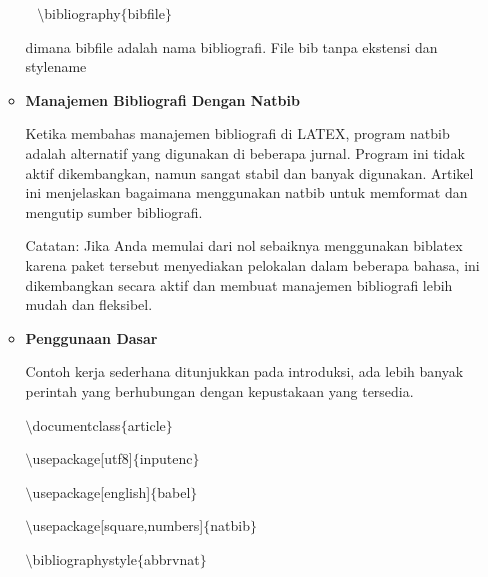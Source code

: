 \begin{itemize}
\begin{itemize}
~ \hspace*{0.5in}$\setminus$bibliography$ \{ $bibfile$ \} $\par
\vspace{\baselineskip}
dimana bibfile adalah nama bibliografi. File bib tanpa ekstensi dan stylename\par
\vspace{\baselineskip}
\vspace{\baselineskip}
\vspace{12pt}
	\item {\fontsize{14pt}{14pt}\selectfont \textbf{Manajemen Bibliografi Dengan Natbib}}\par
\vspace{\baselineskip}
Ketika membahas manajemen bibliografi di LATEX, program natbib adalah alternatif yang digunakan di beberapa jurnal. Program ini tidak aktif dikembangkan, namun sangat stabil dan banyak digunakan. Artikel ini menjelaskan bagaimana menggunakan natbib untuk memformat dan mengutip sumber bibliografi.\par
\vspace{\baselineskip}
Catatan: Jika Anda memulai dari nol sebaiknya menggunakan biblatex karena paket tersebut menyediakan pelokalan dalam beberapa bahasa, ini dikembangkan secara aktif dan membuat manajemen bibliografi lebih mudah dan fleksibel.\par
\vspace{\baselineskip}
	\item {\fontsize{14pt}{14pt}\selectfont \textbf{Penggunaan Dasar}}\par
\vspace{\baselineskip}
Contoh kerja sederhana ditunjukkan pada introduksi, ada lebih banyak perintah yang berhubungan dengan kepustakaan yang tersedia.\par
\vspace{\baselineskip}
\hspace*{0.5in}$\setminus$documentclass$ \{ $article$ \} $\par

$\setminus$usepackage[utf8]$ \{ $inputenc$ \} $\par

$\setminus$usepackage[english]$ \{ $babel$ \} $\par

$\setminus$usepackage[square,numbers]$ \{ $natbib$ \} $\par

$\setminus$bibliographystyle$ \{ $abbrvnat$ \} $\par


\end{itemize}
\end{itemize}
